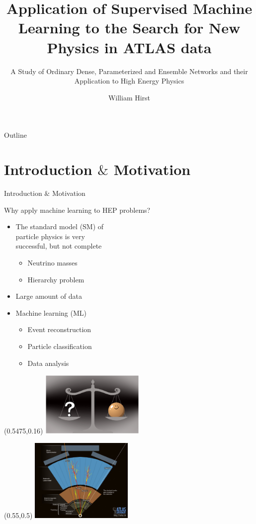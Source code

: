 \documentclass[UKenglish]{beamer}
\author{William Hirst}
\title[Supervised Learning in HEP]{Application of Supervised Machine Learning to the Search for New Physics in ATLAS data}
\subtitle{A Study of Ordinary Dense, Parameterized and Ensemble Networks and their Application to High Energy Physics}
\begin{document}
\begin{frame}{Outline}
    \tableofcontents
\end{frame}


\section{Introduction $\&$ Motivation}
\begin{frame}{Introduction $\&$ Motivation}
    \tableofcontents[currentsection]
\end{frame}

\begin{frame}{Why apply machine learning to HEP problems?}
    \begin{itemize}
        \item The standard model (SM) of \\particle physics is very\\ successful, but not complete
        \begin{itemize}
            \item Neutrino masses 
            \item Hierarchy problem 
        \end{itemize}
        \item Large amount of data
        \item Machine learning (ML)
        \begin{itemize}
            \item Event reconstruction
            \item Particle classification
            \item Data analysis
        \end{itemize}
    \end{itemize}
    \begin{textblock}{1}(0.5475,0.16)
        \includegraphics[width=0.375\textwidth]{figures/neutrino}
    \end{textblock}
    \begin{textblock}{1}(0.55,0.5)
        \includegraphics[width=0.37\textwidth]{figures/detector}
    \end{textblock}
\end{frame}
\end{document}
